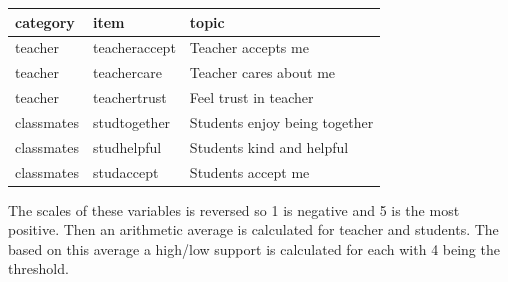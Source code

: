 \documentclass[
]{article}
\begin{document}
\begin{longtable}[]{@{}lll@{}}
\toprule\noalign{}
category & item & topic \\
\midrule\noalign{}
\endhead
\bottomrule\noalign{}
\endlastfoot
teacher & teacheraccept & Teacher accepts me \\
teacher & teachercare & Teacher cares about me \\
teacher & teachertrust & Feel trust in teacher \\
classmates & studtogether & Students enjoy being together \\
classmates & studhelpful & Students kind and helpful \\
classmates & studaccept & Students accept me \\
\end{longtable}

The scales of these variables is reversed so 1 is negative and 5 is the
most positive. Then an arithmetic average is calculated for teacher and
students. The based on this average a high/low support is calculated for
each with 4 being the threshold.
\end{document}
